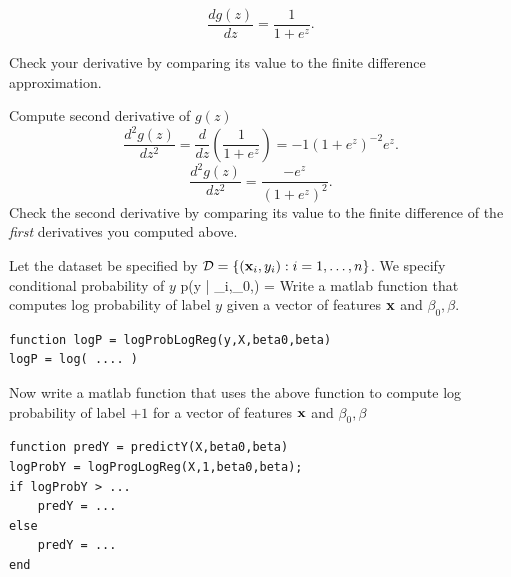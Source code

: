 \documentclass{article}
\begin{document}
\[
\frac{dg(z)}{dz} = \frac{1}{1+e^{z}}.
\]

Check your derivative by comparing its value to the finite difference approximation.

\newproblem{1pt}
Compute second derivative of $g(z)$
\[
\frac{d^{2}g(z)}{dz^{2}} = \frac{d}{dz}(\frac{1}{1+e^{z}}) = -1 (1+e^{z})^{-2} e^{z}.
\]
\[
\frac{d^{2}g(z)}{dz^{2}} = \frac{-e^{z}}{(1+e^{z})^{2}}.
\]
Check the second derivative by comparing its value to the finite difference of the {\em first} derivatives you computed above.


\newproblem{1pt}
Let the dataset be specified by $\mathcal{D} = \left\{ (\mathbf{x}_i,y_i):i=1,\dots,n \right\}$. We specify conditional probability of $y$
\BEQ \label{eq:plr}
p(y | \xx_i,\beta_0,\beta) = 
\EEQ
Write a matlab function that computes log probability of label $y$ given a vector of features $\mathbf{x}$ and $\beta_0,\beta$.
\begin{verbatim}
function logP = logProbLogReg(y,X,beta0,beta)
logP = log( .... )
\end{verbatim}
Now write a matlab function that uses the above function to compute log probability of label $+1$ for a vector of features $\mathbf{x}$ and $\beta_0,\beta$
\begin{verbatim}
function predY = predictY(X,beta0,beta)
logProbY = logProgLogReg(X,1,beta0,beta);
if logProbY > ...
    predY = ...
else
    predY = ...
end
\end{verbatim}
\end{document}
